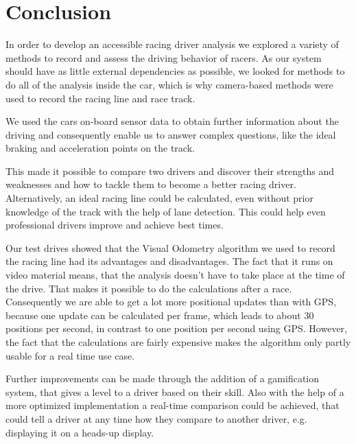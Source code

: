 \section{Conclusion}
\label{sec:conclusion}
In order to develop an accessible racing driver analysis we explored a variety of methods to record and assess the driving behavior of racers. As our system should have as little external dependencies as possible, we looked for methods to do all of the analysis inside the car, which is why camera-based methods were used to record the racing line and race track. 

We used the cars on-board sensor data to obtain further information about the driving and consequently enable us to answer complex questions, like the ideal braking and acceleration points on the track.

This made it possible to compare two drivers and discover their strengths and weaknesses and how to tackle them to become a better racing driver. Alternatively, an ideal racing line could be calculated, even without prior knowledge of the track with the help of lane detection. This could help even professional drivers improve and achieve best times.

Our test drives showed that the Visual Odometry algorithm we used to record the racing line had its advantages and disadvantages. The fact that it runs on video material means, that the analysis doesn't have to take place at the time of the drive. That makes it possible to do the calculations after a race. Consequently we are able to get a lot more positional updates than with GPS, because one update can be calculated per frame, which leads to about 30 positions per second, in contrast to one position per second using GPS. 
However, the fact that the calculations are fairly expensive makes the algorithm only partly usable for a real time use case.

Further improvements can be made through the addition of a gamification system, that gives a level to a driver based on their skill. Also with the help of a more optimized implementation a real-time comparison could be achieved, that could tell a driver at any time how they compare to another driver, e.g. displaying it on a heads-up display.
\clearpage

